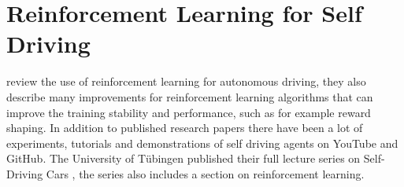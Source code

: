 

\section{Reinforcement Learning for Self Driving}

\autocite{drl_for_ad} review the use of reinforcement learning for autonomous driving, they also describe many improvements for reinforcement learning algorithms that can improve the training stability and performance, such as for example reward shaping.
In addition to published research papers there have been a lot of experiments, tutorials and demonstrations of self driving agents on YouTube and GitHub. The University of Tübingen published their full lecture series on Self-Driving Cars \autocite{tuebingen}, the series also includes a section on reinforcement learning.









